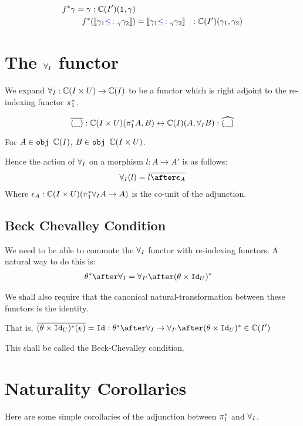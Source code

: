 \documentclass{report}
\begin{document}
\begin{align*}
    f^*{\gamma} = \gamma: \mathbb{C}(I')(\texttt{1}, \gamma)\\
    f^*({\bf [\![}\gamma_1 {\color{blue} \leq\colon}_\gamma \gamma_2{\bf ]\!]}) & = {\bf [\![}\gamma_1 {\color{blue} \leq\colon}_\gamma \gamma_2{\bf ]\!]} &: \mathbb{C}(I')(\gamma_1, \gamma_2)\\
\end{align*}

\section{The $\forall_I$ functor}

We expand $\forall_I: \mathbb{C}(I\times U) \rightarrow \mathbb{C}(I)$ to be a functor which is right adjoint to the re-indexing functor $\pi_1^*$.

\begin{equation}
    \bar{(\_)}: \C(I\times U)(\pstar A, B) \leftrightarrow \C(I)(A, \allI B) : \widehat{(\_)}
\end{equation}

For $A\in\texttt{obj }\mathbb{C}(I)$, $B\in\texttt{obj }\mathbb{C}(I\times U)$.

Hence the action of $\forall_I$ on a morphism $l : A\rightarrow A'$ is as follows:
\begin{eqnarray}
    \allI(l) = \bar{l\after\counit{A}}
\end{eqnarray}
Where $\epsilon_A: \mathbb{C}(I\times U)(\pi_1^*\forall_I A \rightarrow A)$ is the co-unit of the adjunction.

\subsection{Beck Chevalley Condition}
We need to be able to commute the $\forall_I$ functor with re-indexing functors. A natural way to do this is:
\begin{align*}
    \theta\star\after\allI & = \allII\after(\theta\times\Id{U})\star
\end{align*}

We shall also require that the canonical natural-transformation between these functors is the identity.

That is, $\bar{(\theta\times\Id{U})\star(\counit{})} = \Id{}: \theta\star\after\allI \rightarrow \allII\after(\theta\times\Id{U})\star\in \C(I')$

This shall be called the Beck-Chevalley condition.


\section{Naturality Corollaries}
Here are some simple corollaries of the adjunction between $\pi_1^*$ and $\forall_I$.
    
\end{document}
